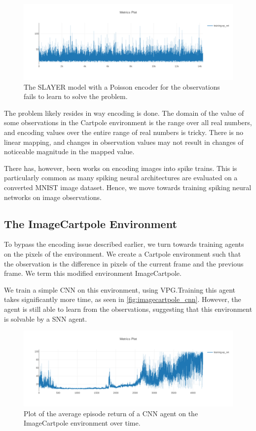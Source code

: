 \documentclass[fyp]{socreport}
\begin{document}
\begin{figure}[htbp] \centering
\includegraphics[width=.9\linewidth]{images/slayer_poisson.png}
\caption{\label{fig:snn_vpg} The SLAYER model with a Poisson encoder for the
observations fails to learn to solve the problem.}
\end{figure}

The problem likely resides in way encoding is done. The domain of the value of
some observations in the Cartpole environment is the range over all real
numbers, and encoding values over the entire range of real numbers is
tricky. There is no linear mapping, and changes in observation values may not
result in changes of noticeable magnitude in the mapped value.

There has, however, been works on encoding images into spike trains.  This is
particularly common as many spiking neural architectures are evaluated on a
converted MNIST image dataset. Hence, we move towards training spiking neural
networks on image observations.

\subsection{The ImageCartpole Environment}

To bypass the encoding issue described earlier, we turn towards training agents
on the pixels of the environment. We create a Cartpole environment such that the
observation is the difference in pixels of the current frame and the previous
frame. We term this modified environment ImageCartpole.

We train a simple CNN on this environment, using VPG.\@ Training this agent takes
significantly more time, as seen in \autoref{fig:imagecartpole_cnn}. However,
the agent is still able to learn from the observations, suggesting that this
environment is solvable by a SNN agent.

\begin{figure}[htbp] \centering
\includegraphics[width=.9\linewidth]{images/imagecartpole_cnn.png}
\caption{\label{fig:imagecartpole_cnn} Plot of the average episode return of a
CNN agent on the ImageCartpole environment over time.}
\end{figure}
\end{document}
